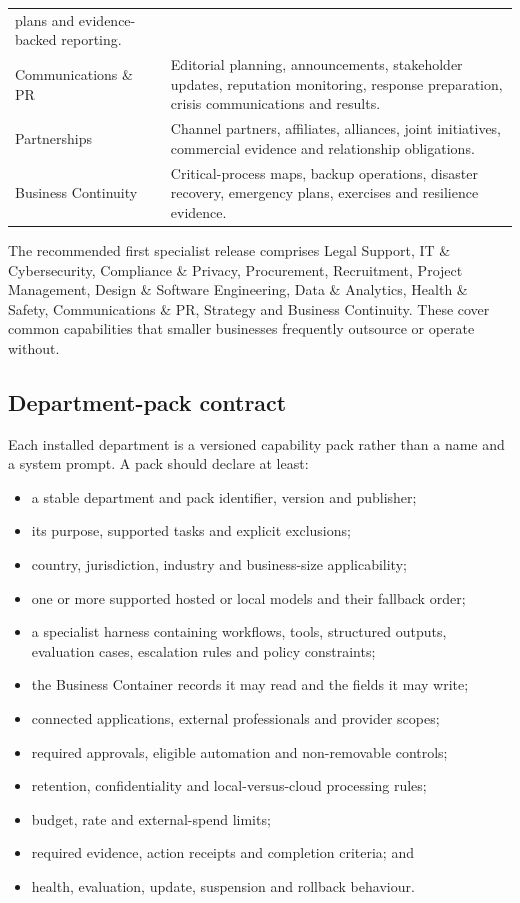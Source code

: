 \begin{longtable}{@{}p{}p{}@{}}
plans and evidence-backed reporting. \\
Communications \& PR & Editorial planning, announcements, stakeholder updates,
reputation monitoring, response preparation, crisis communications and results. \\
Partnerships & Channel partners, affiliates, alliances, joint initiatives,
commercial evidence and relationship obligations. \\
Business Continuity & Critical-process maps, backup operations, disaster
recovery, emergency plans, exercises and resilience evidence. \\
\bottomrule
\end{longtable}

The recommended first specialist release comprises Legal Support, IT \&
Cybersecurity, Compliance \& Privacy, Procurement, Recruitment, Project
Management, Design \& Software Engineering, Data \& Analytics, Health \& Safety,
Communications \& PR, Strategy and Business Continuity.  These cover common
capabilities that smaller businesses frequently outsource or operate without.

\subsection{Department-pack contract}

Each installed department is a versioned capability pack rather than a name and
a system prompt.  A pack should declare at least:

\begin{itemize}[leftmargin=*]
  \item a stable department and pack identifier, version and publisher;
  \item its purpose, supported tasks and explicit exclusions;
  \item country, jurisdiction, industry and business-size applicability;
  \item one or more supported hosted or local models and their fallback order;
  \item a specialist harness containing workflows, tools, structured outputs,
        evaluation cases, escalation rules and policy constraints;
  \item the Business Container records it may read and the fields it may write;
  \item connected applications, external professionals and provider scopes;
  \item required approvals, eligible automation and non-removable controls;
  \item retention, confidentiality and local-versus-cloud processing rules;
  \item budget, rate and external-spend limits;
  \item required evidence, action receipts and completion criteria; and
  \item health, evaluation, update, suspension and rollback behaviour.
\end{itemize}

